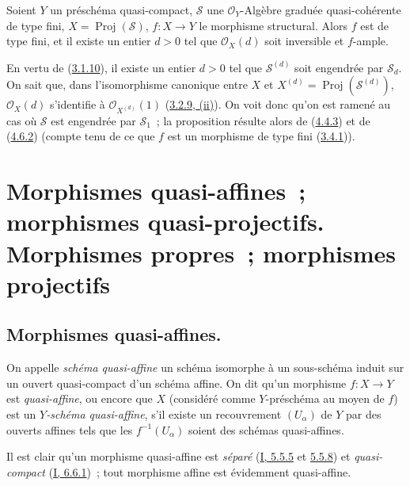\begin{proposition}[4.6.18]
\label{II.4.6.18-fr}
Soient $Y$ un préschéma quasi-compact, $\mathcal{S}$ une
$\mathcal{O}_Y$-Algèbre graduée quasi-cohérente de type fini,
$X=\operatorname{Proj}(\mathcal{S})$, $f:X\to Y$ le morphisme structural.
Alors $f$ est de type fini, et il existe un entier $d>0$ tel que
$\mathcal{O}_X(d)$ soit inversible et $f$-ample.
\end{proposition}

En vertu de (\hyperref[II.3.1.10-fr]{3.1.10}), il existe un entier $d>0$
tel que $\mathcal{S}^{(d)}$ soit engendrée par $\mathcal{S}_d$. On sait que,
dans l'isomorphisme canonique entre $X$ et
$X^{(d)}=\operatorname{Proj}(\mathcal{S}^{(d)})$, $\mathcal{O}_X(d)$
s'identifie à $\mathcal{O}_{X^{(d)}}(1)$
(\hyperref[II.3.2.9-fr]{3.2.9, (ii)}). On voit donc qu'on est ramené au cas
où $\mathcal{S}$ est engendrée par $\mathcal{S}_1$~; la proposition résulte
alors de (\hyperref[II.4.4.3-fr]{4.4.3}) et de
(\hyperref[II.4.6.2-fr]{4.6.2}) (compte tenu de ce que $f$ est un morphisme
de type fini (\hyperref[II.3.4.1-fr]{3.4.1})).

\section{Morphismes quasi-affines~; morphismes quasi-projectifs. Morphismes
propres~; morphismes projectifs}
\label{section:II.5-fr}

\subsection{Morphismes quasi-affines.}
\label{subsection:II.5.1-fr}

\begin{definition}[5.1.1]
\label{II.5.1.1-fr}
On appelle \emph{schéma quasi-affine} un schéma isomorphe à un sous-schéma
induit sur un ouvert quasi-compact d'un schéma affine. On dit qu'un morphisme
$f:X\to Y$ est \emph{quasi-affine}, ou encore que $X$ (considéré comme
$Y$-préschéma au moyen de $f$) est un \emph{$Y$-schéma quasi-affine}, s'il
existe un recouvrement $(U_\alpha)$ de $Y$ par des ouverts affines tels que
les $f^{-1}(U_\alpha)$ soient des schémas quasi-affines.
\end{definition}

Il est clair qu'un morphisme quasi-affine est \emph{séparé}
(\hyperref[I.5.5.5-fr]{I, 5.5.5} et \hyperref[I.5.5.8-fr]{5.5.8}) et
\emph{quasi-compact} (\hyperref[I.6.6.1-fr]{I, 6.6.1})~; tout morphisme
affine est évidemment quasi-affine.

